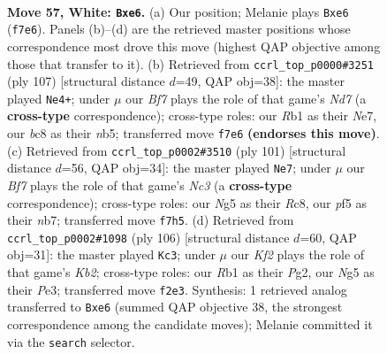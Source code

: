 \documentclass[11pt]{article}
\begin{document}
\clearpage

\begin{figure}[p]\centering
\begin{subfigure}{0.46\textwidth}\centering
\resizebox{\linewidth}{!}{%
\newchessgame
\chessboard[
  setfen={2b5/P2n1Bk1/4p3/5pN1/1pN2P2/1Pn3P1/5K1P/1R6 w - - 3 57},
  showmover=false,
  pgfstyle=straightmove, color=movearrow, markmove={f7-e6}
]}
\caption{}
\end{subfigure}\hfill
\begin{subfigure}{0.46\textwidth}\centering
\resizebox{\linewidth}{!}{%
\newchessgame
\chessboard[
  setfen={7k/4np2/3p2p1/1N1b2Pp/1N3P1P/1Pp5/3n1K2/3R4 b - - 0 54},
  showmover=false,
  pgfstyle=straightmove, color=movearrow, markmove={d2-e4}
]}
\caption{}
\end{subfigure}
\\[4pt]
\begin{subfigure}{0.46\textwidth}\centering
\resizebox{\linewidth}{!}{%
\newchessgame
\chessboard[
  setfen={2r5/pN4p1/P1n2k1p/1P1p1P1b/2pP4/2K5/5P2/2R2N2 b - - 0 51},
  showmover=false,
  pgfstyle=straightmove, color=movearrow, markmove={c6-e7}
]}
\caption{}
\end{subfigure}\hfill
\begin{subfigure}{0.46\textwidth}\centering
\resizebox{\linewidth}{!}{%
\newchessgame
\chessboard[
  setfen={8/1p4p1/4p2p/p2k3P/Pn1N4/1P2P3/1K4P1/8 w - - 1 54},
  showmover=false,
  pgfstyle=straightmove, color=movearrow, markmove={b2-c3}
]}
\caption{}
\end{subfigure}
\caption{\textbf{Move 57, White: \texttt{Bxe6}.} (a) Our position; Melanie plays \texttt{Bxe6} (\texttt{f7e6}). Panels (b)--(d) are the retrieved master positions whose correspondence most drove this move (highest QAP objective among those that transfer to it). (b) Retrieved from \texttt{ccrl\_top\_p0000\#3251} (ply 107) [structural distance $d$=49, QAP obj=38]: the master played \texttt{Ne4+}; under $\mu$ our \emph{Bf7} plays the role of that game's \emph{Nd7} (a \textbf{cross-type} correspondence); cross-type roles: our \emph{R}b1 as their \emph{N}e7, our \emph{b}c8 as their \emph{n}b5; transferred move \texttt{f7e6} \textbf{(endorses this move)}. (c) Retrieved from \texttt{ccrl\_top\_p0002\#3510} (ply 101) [structural distance $d$=56, QAP obj=34]: the master played \texttt{Ne7}; under $\mu$ our \emph{Bf7} plays the role of that game's \emph{Nc3} (a \textbf{cross-type} correspondence); cross-type roles: our \emph{N}g5 as their \emph{R}c8, our \emph{p}f5 as their \emph{n}b7; transferred move \texttt{f7h5}. (d) Retrieved from \texttt{ccrl\_top\_p0002\#1098} (ply 106) [structural distance $d$=60, QAP obj=31]: the master played \texttt{Kc3}; under $\mu$ our \emph{Kf2} plays the role of that game's \emph{Kb2}; cross-type roles: our \emph{R}b1 as their \emph{P}g2, our \emph{N}g5 as their \emph{P}e3; transferred move \texttt{f2e3}. Synthesis: 1 retrieved analog transferred to \texttt{Bxe6} (summed QAP objective 38, the strongest correspondence among the candidate moves); Melanie committed it via the \texttt{search} selector.}
\label{fig:thought-m112}
\end{figure}
\end{document}
